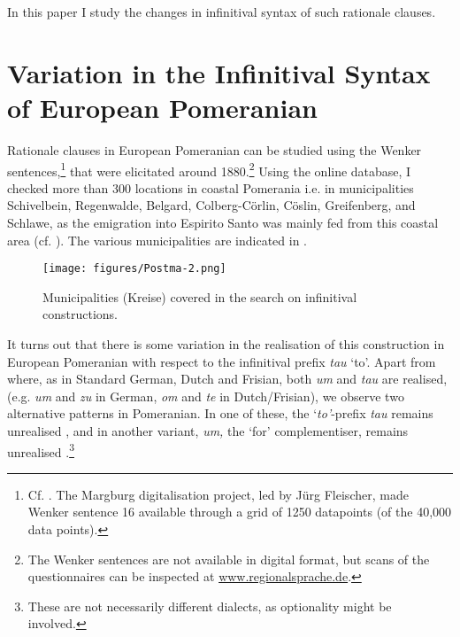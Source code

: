 \documentclass[output=paper,hidelinks,draftmode]{langscibook}
\begin{document}
\hspace*{-2pt}In this paper I study the changes in infinitival syntax of such rationale clauses.

\section{Variation in the Infinitival Syntax of European Pomeranian}

Rationale clauses in European Pomeranian can be studied using the Wenker sentences,\footnote{Cf. \citet{Demske2011}. The Margburg digitalisation project, led by Jürg Fleischer, made Wenker sentence 16 available through a grid of 1250 datapoints (of the 40,000 data points).} that were elicitated around 1880.\footnote{The Wenker sentences are not available in digital format, but scans of the questionnaires can be inspected at \url{www.regionalsprache.de}.} Using the online database, I checked more than 300 locations in coastal Pomerania i.e. in municipalities Schivelbein, Regenwalde, Belgard, Colberg-Cörlin, Cöslin, Greifenberg, and Schlawe, as the emigration into Espirito Santo was mainly fed from this coastal area (cf. \citealt[167]{Granzow2009}). The various municipalities are indicated in .


\begin{figure}
\texttt{[image: figures/Postma-2.png]}
  \caption{
  Municipalities (Kreise) covered in the search on infinitival constructions.\\ 
}
\label{fig:postma:2}
\end{figure}

It turns out that there is some variation in the realisation of this construction in European Pomeranian with respect to the infinitival prefix \textit{tau} {}`to'. Apart from  where, as in Standard German, Dutch and Frisian, both \textit{um} and \textit{tau} are realised, (e.g. \textit{um} and \textit{zu} in German, \textit{om} and \textit{te} in Dutch/Frisian), we observe two alternative patterns in Pomeranian. In one of these, the `\textit{to'}{}-prefix \textit{tau} remains unrealised , and in another variant, \textit{um,} the `for' complementiser, remains unrealised .\footnote{These are not necessarily different dialects, as optionality might be involved.}
\newpage
\end{document}
